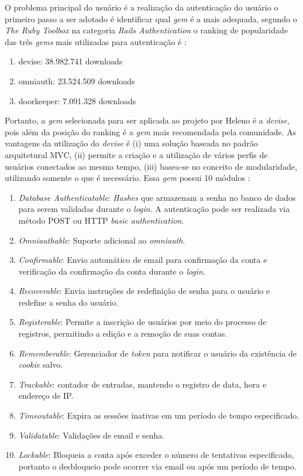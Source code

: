O problema principal do usuário é a realização da autenticação do usuário o primeiro passo a ser adotado é identificar qual \textit{gem} é a mais adequada, segundo o \textit{The Ruby Toolbox} na categoria \textit{Rails Authentication} o ranking de popularidade das três \textit{gems} mais utilizadas para autenticação é \cite{rubytoolbox}:

\begin{enumerate}
	\item devise: 38.982.741 downloads
	\item omniauth: 23.524.509 downloads
	\item doorkeeper: 7.091.328 downloads
\end{enumerate}

Portanto, a \textit{gem} selecionada para ser aplicada ao projeto por Heleno é a \textit{devise}, pois além da posição do ranking é a \textit{gem} mais recomendada pela comunidade. As vantagens da utilização do \textit{devise} é  (i) uma solução baseada no padrão arquitetural MVC, (ii) permite a criação e a utilização de vários perfis de usuários conectados ao mesmo tempo, (iii) basea-se no conceito de modularidade, utilizando somente o que é necessário. Essa \textit{gem} possui 10 módulos \cite{gemdevise}: 

\begin{enumerate}
	\item \textit{Database Authenticatable}: \textit{Hashes} que armazenam a senha no banco de dados para serem validadas durante o \textit{login}. A autenticação pode ser realizada via método POST ou HTTP \textit{basic authentication}. 
	\item \textit{Omniauthable}: Suporte adicional ao \textit{omniauth}.
	\item \textit{Confirmable}: Envio automático de email para confirmação da conta e verificação da confirmação da conta durante o \textit{login}.
	\item \textit{Recoverable}: Envia instruções de redefinição de senha para o usuário e redefine a senha do usuário.
	\item \textit{Registerable}: Permite a inscrição de usuários por meio do processo de registros, permitindo a edição e a remoção de suas contas.
	\item \textit{Rememberable}: Gerenciador de \textit{token} para notificar o usuário da existência de \textit{cookie} salvo.
	\item \textit{Trackable}: contador de entradas, mantendo o registro de data, hora e endereço de IP.
	\item \textit{Timeoutable}: Expira as sessões inativas em um período de tempo especificado. 
	\item \textit{Validatable}: Validações de email e senha. 
	\item \textit{Lockable}: Bloqueia a conta após exceder o número de tentativas especificado, portanto o desbloqueio pode ocorrer via email ou após um período de tempo. 
\end{enumerate}

